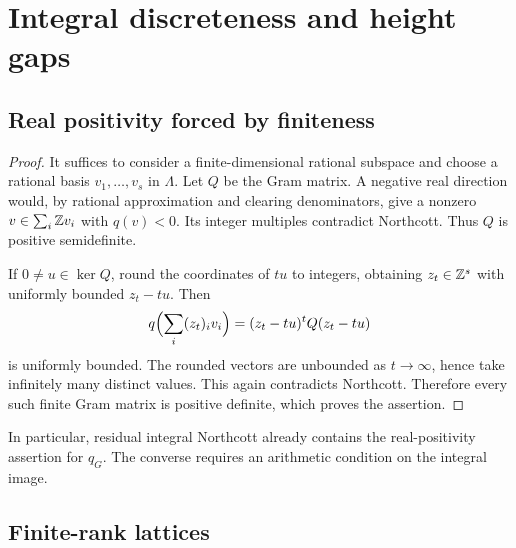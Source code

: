 \section{Integral discreteness and height gaps}\label{sec:lattices}

\subsection{Real positivity forced by finiteness}\label{sec:northcott-real}


\begin{proof}
It suffices to consider a finite-dimensional rational subspace
and choose a rational basis \(v_1,\ldots,v_s\) in \(\Lambda\).
Let \(Q\) be the Gram matrix. A negative real direction would,
by rational approximation and clearing denominators, give a
nonzero \(v\in\sum_i\mathbb Z v_i\) with \(q(v)<0\). Its integer
multiples contradict Northcott. Thus \(Q\) is positive semidefinite.

If \(0\ne u\in\ker Q\), round the coordinates of \(tu\) to
integers, obtaining \(z_t\in\mathbb Z^s\) with uniformly bounded
\(z_t-tu\). Then
\[
 q\Bigl(\sum_i(z_t)_iv_i\Bigr)
       =(z_t-tu)^tQ(z_t-tu)
\]
is uniformly bounded. The rounded vectors are unbounded as
\(t\to\infty\), hence take infinitely many distinct values.
This again contradicts Northcott. Therefore every such finite
Gram matrix is positive definite, which proves the assertion.
\end{proof}

In particular, residual integral Northcott already contains the
real-positivity assertion for \(q_G\). The converse requires an
arithmetic condition on the integral image.

\subsection{Finite-rank lattices}\label{sec:finite-rank-lattices}

